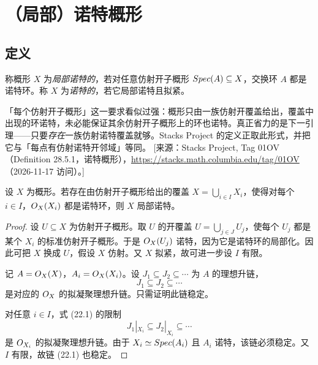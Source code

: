 
\section{（局部）诺特概形}\label{sec:22}

\subsection{定义}\label{sec:22.1}

\begin{definition}\label{def:22.1.1}
称概形 $X$ 为\emph{局部诺特的}，若对任意仿射开子概形 $Spec(A) \subseteq X$，交换环 $A$ 都是诺特环。称 $X$ 为\emph{诺特的}，若它局部诺特且拟紧。
\end{definition}

\begin{yizhu}
「每个仿射开子概形」这一要求看似过强：概形只由一族仿射开覆盖给出，覆盖中出现的环诺特，未必能保证其余仿射开子概形上的环也诺特。真正省力的是下一引理——只要\emph{存在}一族仿射诺特覆盖就够。Stacks Project 的定义正取此形式，并把它与「每点有仿射诺特开邻域」等同。
[来源：Stacks Project, Tag 01OV（Definition 28.5.1，诺特概形），\url{https://stacks.math.columbia.edu/tag/01OV}（2026-11-17 访问）。]
\end{yizhu}

\begin{lemma}\label{lem:22.1.2}
设 $X$ 为概形。若存在由仿射开子概形给出的覆盖 $X = \bigcup_{i \in I} X_i$，使得对每个 $i \in I$，$O_X(X_i)$ 都是诺特环，则 $X$ 局部诺特。
\end{lemma}

\begin{proof}
设 $U \subseteq X$ 为仿射开子概形。取 $U$ 的开覆盖 $U = \bigcup_{j \in J} U_j$，使每个 $U_j$ 都是某个 $X_i$ 的标准仿射开子概形。于是 $O_X(U_j)$ 诺特，因为它是诺特环的局部化。因此可把 $X$ 换成 $U$，假设 $X$ 仿射。又 $X$ 拟紧，故可进一步设 $I$ 有限。

记 $A = O_X(X)$，$A_i = O_X(X_i)$。设 $J_1 \subseteq J_2 \subseteq \cdots$ 为 $A$ 的理想升链，
\[
J_1 \subseteq J_2 \subseteq \cdots \tag{22.1}\label{eq:22.1}
\]
是对应的 $O_X$ 的拟凝聚理想升链。只需证明此链稳定。

对任意 $i \in I$，式 (22.1) 的限制
\[
J_1|_{X_i} \subseteq J_2|_{X_i} \subseteq \cdots
\]
是 $O_{X_i}$ 的拟凝聚理想升链。由于 $X_i \simeq Spec(A_i)$ 且 $A_i$ 诺特，该链必须稳定。又 $I$ 有限，故链 (22.1) 也稳定。
\end{proof}

